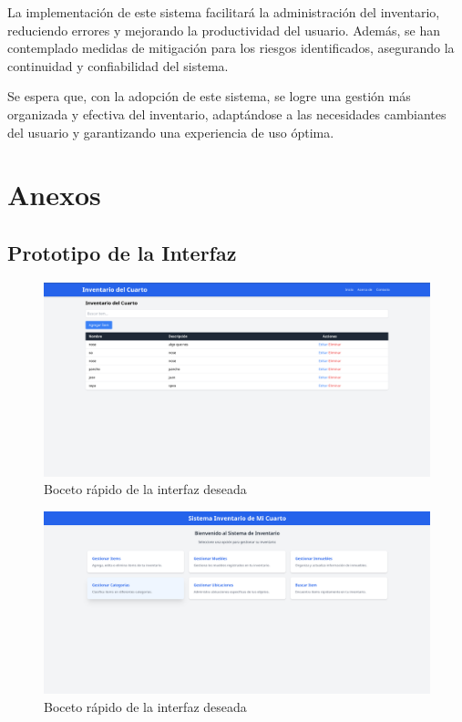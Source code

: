 \documentclass{article}
\begin{document}
La implementación de este sistema facilitará la administración del inventario, reduciendo errores y mejorando la productividad del usuario. Además, se han contemplado medidas de mitigación para los riesgos identificados, asegurando la continuidad y confiabilidad del sistema.

Se espera que, con la adopción de este sistema, se logre una gestión más organizada y efectiva del inventario, adaptándose a las necesidades cambiantes del usuario y garantizando una experiencia de uso óptima.

\newpage
\section{Anexos}
\subsection{Prototipo de la Interfaz}
\begin{figure}[H]
    \center
    \includegraphics[width=\textwidth]{img/image1.png}
    \caption{Boceto rápido de la interfaz deseada}
\end{figure}

\begin{figure}[H]
    \center
    \includegraphics[width=\textwidth]{img/principal.png}
    \caption{Boceto rápido de la interfaz deseada}
\end{figure}
\end{document}

